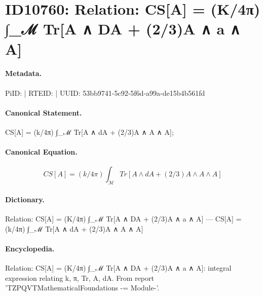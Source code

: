 \section*{ID10760: Relation: CS[A] = (K/4π) ∫\_ℳ Tr[A ∧ DA + (2/3)A ∧ a ∧ A]}
\paragraph{Metadata.}
PiID:  | RTEID:  | UUID: 53bb9741-5c92-5f6d-a99a-de15b4b561fd

\paragraph{Canonical Statement.}
CS[A] = (k/4π) ∫\_ℳ Tr[A ∧ dA + (2/3)A ∧ A ∧ A];

\paragraph{Canonical Equation.}
\[
CS[A] = (k/4π) ∫_ℳ Tr[A ∧ dA + (2/3)A ∧ A ∧ A]
\]

\paragraph{Dictionary.}
Relation: CS[A] = (K/4π) ∫\_ℳ Tr[A ∧ DA + (2/3)A ∧ a ∧ A] — CS[A] = (k/4π) ∫\_ℳ Tr[A ∧ dA + (2/3)A ∧ A ∧ A]

\paragraph{Encyclopedia.}
Relation: CS[A] = (K/4π) ∫\_ℳ Tr[A ∧ DA + (2/3)A ∧ a ∧ A]: integral expression relating k, π, Tr, A, dA. From report 'TZPQVTMathematicalFoundations -= Module-'.
